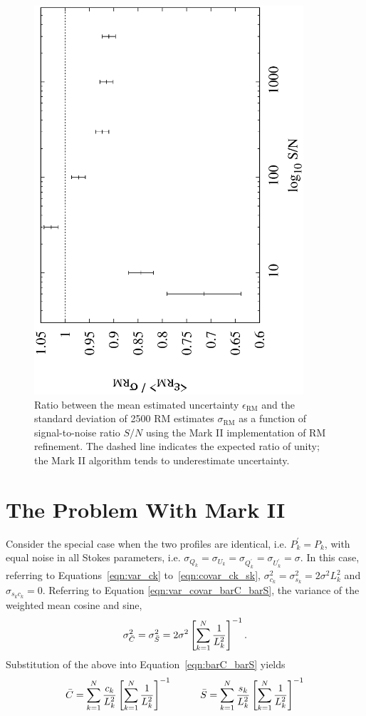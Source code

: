 \documentclass[12pt]{article}
\begin{document}
\begin{figure}
\centerline{\includegraphics[angle=-90,width=100mm]{plots/mark2_error_ratio.eps}}
\caption{\label{fig:mark2_error_ratio}
Ratio between the mean estimated uncertainty $\epsilon_\mathrm{RM}$ and the standard deviation of 2500 RM estimates $\sigma_\mathrm{RM}$ as a function of signal-to-noise ratio $S/N$
using the Mark II implementation of RM refinement.  The dashed line indicates the expected ratio of unity;
the Mark II algorithm tends to underestimate uncertainty.}
\end{figure}


\section{The Problem With Mark II}

Consider the special case when the two profiles are identical,
i.e. $P_k^\prime = P_k$, with equal noise in all Stokes parameters, 
i.e. $\sigma_{Q_k}=\sigma_{U_k}=\sigma_{Q^\prime_k}=\sigma_{U^\prime_k}=\sigma$.
In this case, referring to Equations~\ref{eqn:var_ck} to~\ref{eqn:covar_ck_sk},
$\sigma^2_{c_k}=\sigma^2_{s_k}=2\sigma^2 L_k^2$ and $\sigma_{s_k c_k}=0$.
%
Referring to Equation \ref{eqn:var_covar_barC_barS}, the variance of the weighted
mean cosine and sine,
\begin{equation}
\sigma_{\bar C}^2 = \sigma_{\bar S}^2 = 2\sigma^2 \left[ \sum_{k=1}^N{1\over L_k^2} \right]^{-1}.
\end{equation}
%
Substitution of the above into Equation~\ref{eqn:barC_barS} yields
\begin{equation}
\bar C = \sum_{k=1}^N { c_k \over L_k^2 } \left[ \sum_{k=1}^N { 1 \over L_k^2 } \right]^{-1}
\hspace{1cm}
\bar S = \sum_{k=1}^N { s_k \over L_k^2 } \left[ \sum_{k=1}^N { 1 \over L_k^2 } \right]^{-1}
\end{equation}
\end{document}
